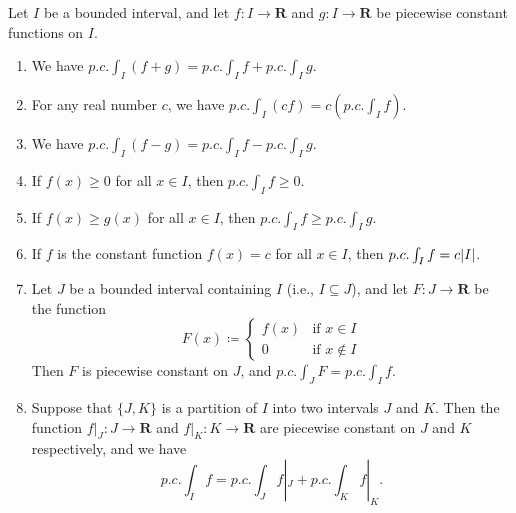 \setcounter{theorem}{15}
\begin{theorem}\label{11.2.16}
    Let \(I\) be a bounded interval, and let \(f : I \to \mathbf{R}\) and \(g : I \to \mathbf{R}\) be piecewise constant functions on \(I\).
    \begin{enumerate}
        \item We have \(p.c. \int_I (f + g) = p.c. \int_I f + p.c. \int_I g\).
        \item For any real number \(c\), we have \(p.c. \int_I (cf) = c (p.c. \int_I f)\).
        \item We have \(p.c. \int_I (f - g) = p.c. \int_I f - p.c. \int_I g\).
        \item If \(f(x) \geq 0\) for all \(x \in I\), then \(p.c. \int_I f \geq 0\).
        \item If \(f(x) \geq g(x)\) for all \(x \in I\), then \(p.c. \int_I f \geq p.c. \int_I g\).
        \item If \(f\) is the constant function \(f(x) = c\) for all \(x \in I\), then \(p.c. \int_I f = c \abs*{I}\).
        \item Let \(J\) be a bounded interval containing \(I\) (i.e., \(I \subseteq J\)), and let \(F : J \to \mathbf{R}\) be the function
              \[
                  F(x) \coloneqq \begin{cases}
                      f(x) & \text{if } x \in I    \\
                      0    & \text{if } x \notin I
                  \end{cases}
              \]
              Then \(F\) is piecewise constant on \(J\), and \(p.c. \int_J F = p.c. \int_I f\).
        \item Suppose that \(\{J, K\}\) is a partition of \(I\) into two intervals \(J\) and \(K\).
              Then the function \(f|_J : J \to \mathbf{R}\) and \(f|_K : K \to \mathbf{R}\) are piecewise constant on \(J\) and \(K\) respectively, and we have
              \[
                  p.c. \int_I f = p.c. \int_J f|_J + p.c. \int_K f|_K.
              \]
    \end{enumerate}
\end{theorem}

